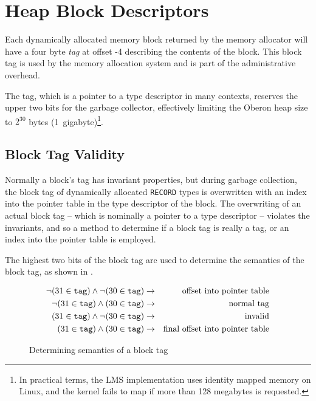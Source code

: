 \section{Heap Block Descriptors}\label{memlay:block-descriptors}

Each dynamically allocated memory block returned by the memory
allocator will have a four byte \emph{tag} at offset -4 describing the
contents of the block.  This block tag is used by the memory
allocation system and is part of the administrative overhead.

The tag, which is a pointer to a type descriptor in many contexts,
reserves the upper two bits for the garbage collector, effectively
limiting the Oberon heap size to $2^{30}$ bytes
(1~gigabyte)\footnote{In practical terms, the LMS implementation uses
  identity mapped memory on Linux, and the kernel fails to map if more
  than 128 megabytes is requested.}.

\subsection{Block Tag Validity}

Normally a block's tag has invariant properties, but during garbage
collection, the block tag of dynamically allocated \texttt{RECORD}
types is overwritten with an index into the pointer table in the type
descriptor of the block.  The overwriting of an actual block tag --
which is nominally a pointer to a type descriptor -- violates the
invariants, and so a method to determine if a block tag is really a
tag, or an index into the pointer table is employed.

The highest two bits of the block tag are used to determine the
semantics of the block tag, as shown in
.

\begin{figure}[h]
  \begin{eqnarray}
    \neg (31 \in \textrm{\texttt{tag}}) \wedge \neg (30 \in \textrm{\texttt{tag}})  & \implies & \textrm{offset into pointer table} \nonumber \\
    \neg (31 \in \textrm{\texttt{tag}}) \wedge (30 \in \textrm{\texttt{tag}}) & \implies & \textrm{normal tag} \nonumber \\
    (31 \in \textrm{\texttt{tag}}) \wedge \neg (30 \in \textrm{\texttt{tag}}) & \implies & \textrm{invalid} \nonumber \\
    (31 \in \textrm{\texttt{tag}}) \wedge (30 \in \textrm{\texttt{tag}})  & \implies & \textrm{final offset into pointer table} \nonumber
  \end{eqnarray}
  \caption{Determining semantics of a block tag}
  \label{memlay:block-tag-upper-bits}
\end{figure}

